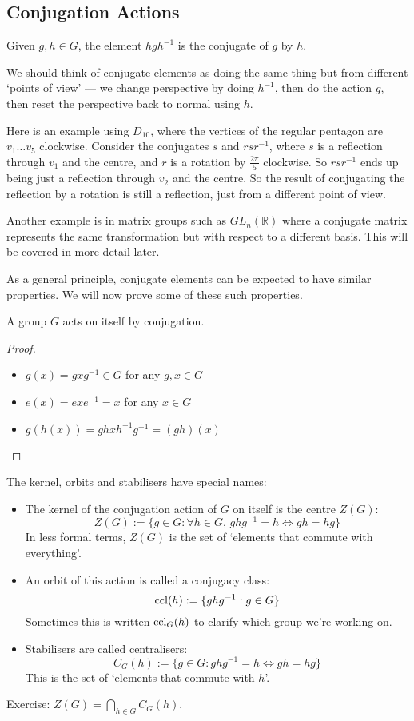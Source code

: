 \subsection{Conjugation Actions}
\begin{definition}
	Given $g, h \in G$, the element $hgh^{-1}$ is the conjugate of $g$ by $h$.
\end{definition}
We should think of conjugate elements as doing the same thing but from different `points of view' --- we change perspective by doing $h^{-1}$, then do the action $g$, then reset the perspective back to normal using $h$.

Here is an example using $D_{10}$, where the vertices of the regular pentagon are $v_1 \dots v_5$ clockwise. Consider the conjugates $s$ and $rsr^{-1}$, where $s$ is a reflection through $v_1$ and the centre, and $r$ is a rotation by $\frac{2\pi}{5}$ clockwise. So $rsr^{-1}$ ends up being just a reflection through $v_2$ and the centre. So the result of conjugating the reflection by a rotation is still a reflection, just from a different point of view.

Another example is in matrix groups such as $GL_n(\mathbb R)$ where a conjugate matrix represents the same transformation but with respect to a different basis. This will be covered in more detail later.

As a general principle, conjugate elements can be expected to have similar properties. We will now prove some of these such properties.
\begin{proposition}
	A group $G$ acts on itself by conjugation.
\end{proposition}
\begin{proof}
	\begin{itemize}
		\item $g(x) = gxg^{-1} \in G$ for any $g, x \in G$
		\item $e(x) = exe^{-1} = x$ for any $x \in G$
		\item $g(h(x)) = ghxh^{-1}g^{-1} = (gh)(x)$
	\end{itemize}
\end{proof}
\begin{definition}
	The kernel, orbits and stabilisers have special names:
	\begin{itemize}
		\item The kernel of the conjugation action of $G$ on itself is the centre $Z(G)$:
		      \[ Z(G) := \{ g \in G : \forall h \in G,\, ghg^{-1} = h \iff gh=hg \} \]
		      In less formal terms, $Z(G)$ is the set of `elements that commute with everything'.
		\item An orbit of this action is called a conjugacy class:
		      \[ \operatorname{ccl}(h) := \{ ghg^{-1}: g \in G \} \]
		      Sometimes this is written $\operatorname{ccl}_G(h)$ to clarify which group we're working on.
		\item Stabilisers are called centralisers:
		      \[ C_G(h) := \{ g \in G : ghg^{-1} = h \iff gh = hg \} \]
		      This is the set of `elements that commute with $h$'.
	\end{itemize}
\end{definition}
Exercise: $Z(G) = \bigcap_{h \in G} C_G(h)$.

